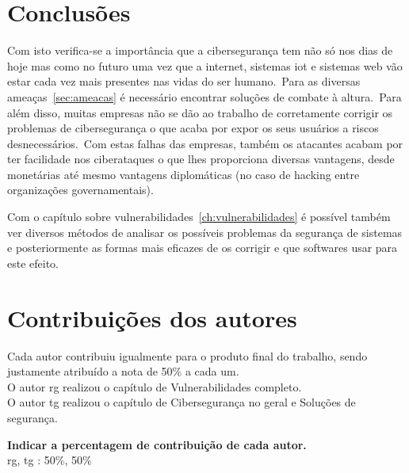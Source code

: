 \documentclass{report}
\begin{document}
\chapter{Conclusões}
\label{ch:conclusao}
Com isto verifica-se a importância que a cibersegurança tem não só nos dias de hoje mas como no futuro uma vez que a internet, sistemas \ac{iot} e sistemas web vão estar cada vez mais presentes nas vidas do ser humano.\ Para as diversas ameaças~\ref{sec:ameacas} é necessário encontrar soluções de combate à altura.\ Para além disso, muitas empresas não se dão ao trabalho de corretamente corrigir os problemas de cibersegurança o que acaba por expor os seus usuários a riscos desnecessários.\ Com estas falhas das empresas, também os atacantes acabam por ter facilidade nos ciberataques o que lhes proporciona diversas vantagens, desde monetárias até mesmo vantagens diplomáticas (no caso de hacking entre organizações governamentais).
\par Com o capítulo sobre vulnerabilidades~\ref{ch:vulnerabilidades} é possível também ver diversos métodos de analisar os possíveis problemas da segurança de sistemas e posteriormente as formas mais eficazes de os corrigir e que softwares usar para este efeito.

\chapter*{Contribuições dos autores}
Cada autor contribuiu igualmente para o produto final do trabalho, sendo justamente atribuído a nota de 50\% a cada um. \\
O autor \ac{rg} realizou o capítulo de Vulnerabilidades completo. \\
O autor \ac{tg} realizou o capítulo de Cibersegurança no geral e Soluções de segurança.

\vspace{10pt}
\textbf{Indicar a percentagem de contribuição de cada autor.}\\

\ac{rg}, \ac{tg} : 50\%, 50\%\\

\end{document}
